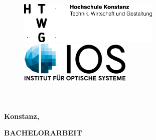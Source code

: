 \begin{titlepage}

\vspace*{-2.5cm}

\begin{figure}[h]
\hspace*{-2cm}
\includegraphics[height=2cm]{title/HTWG-Logo_de_300dpi.png}
\hspace*{4cm}\includegraphics[height=2cm,]{title/IOS_Logo2016_lettering_de.png}


\end{figure}

\vspace{2cm}

\begin{center}
	 \LARGE{
		\textbf{\thema} \\[5cm]
	}
	\Large{
		\textbf{\autor}} \\[5.5cm]
	\large{
		\textbf{Konstanz, \abgabedatum} \\[2.3cm]
	}
	
	\Huge{
		\textbf{{\sf BACHELORARBEIT}}
	}
\end{center}

\end{titlepage}
